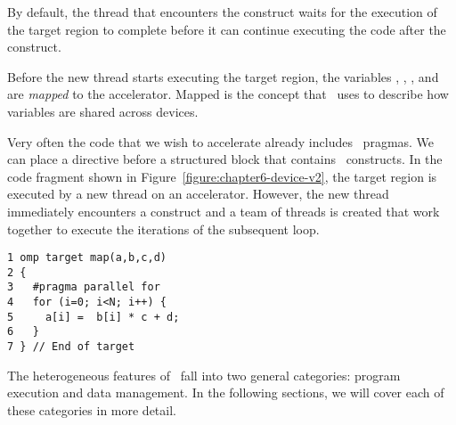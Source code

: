 By default, the thread that encounters the  construct waits for
the execution of the target region to complete before it can continue executing
the code after the  construct.

Before the new thread starts executing the target region, the 
variables , , , and  are \emph{mapped} to the accelerator.
Mapped is the concept that \OMP\ uses to
describe how variables are shared across devices.


Very often the code that we wish to accelerate already includes \OMP\ pragmas.
We can place a  directive before a structured block that contains
\OMP\ constructs.  In the code fragment shown in
Figure~\ref{figure:chapter6-device-v2}, the target region is executed by a new
thread on an accelerator.  However, the new thread immediately encounters a
 construct and a team of threads is created that work
together to execute the iterations of the subsequent loop.

\begin{figure*}[!tbhp]
\begin{verbatim}
1 omp target map(a,b,c,d)
2 {
3   #pragma parallel for
4   for (i=0; i<N; i++) {
5     a[i] =  b[i] * c + d;
6   }
7 } // End of target
\end{verbatim}
\caption{ \textbf {Augmented code fragment with a parallel region} -- \small
          The parallel region is executed by a team of threads running
          on an accelerator.
        }
\label{figure:chapter6-device-v2}
\end{figure*}

The heterogeneous features of \OMP\ fall into two general categories: program
execution and data management.  In the following sections, we will cover each of
these categories in more detail.

